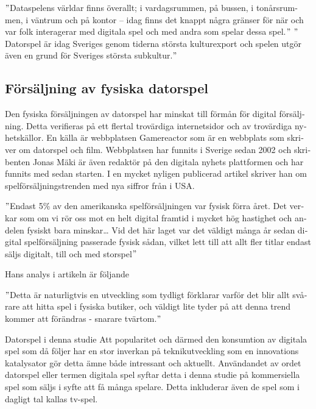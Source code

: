 \documentclass[11p]{article}
\begin{document}
\begin{otherlanguage}{swedish}
        \("\)Dataspelens världar finns överallt; i vardagsrummen, på bussen, i tonårsrummen, i väntrum och på kontor – idag finns det knappt några gränser för när och var folk interagerar med digitala spel och med andra som spelar dessa spel.\("\)
        \("\)Datorspel är idag Sveriges genom tiderna största kulturexport och spelen utgör även en grund för Sveriges största subkultur.\("\)\parencite{worlds}

        \setlength{\leftskip}{0cm}


        \subsection{Försäljning av fysiska datorspel}
        Den fysiska försäljningen av datorspel har minskat till förmån för digital försäljning.
        Detta verifieras på ett flertal trovärdiga internetsidor och av trovärdiga nyhetskällor.
        En källa är webbplatsen Gamereactor som är en webbplats som skriver om datorspel och film.
        Webbplatsen har funnits i Sverige sedan 2002 och skribenten Jonas Mäki är även redaktör på den digitala nyhets plattformen och har funnits med sedan starten.
        I en mycket nyligen publicerad artikel skriver han om spelförsäljningstrenden med nya siffror från i USA.

        \setlength{\leftskip}{1cm}

        \("\)Endast 5\% av den amerikanska spelförsäljningen var fysisk förra året.
        Det verkar som om vi rör oss mot en helt digital framtid i mycket hög hastighet och andelen fysiskt bara minskar\ldots
        Vid det här laget var det väldigt många år sedan digital spelförsäljning passerade fysisk sådan, vilket lett till att allt fler titlar endast säljs digitalt, till och med storspel\("\)

        \setlength{\leftskip}{0cm}

        Hans analys i artikeln är följande

        \setlength{\leftskip}{1cm}

        \("\)Detta är naturligtvis en utveckling som tydligt förklarar varför det blir allt svårare att hitta spel i fysiska butiker, och väldigt lite tyder på att denna trend kommer att förändras - snarare tvärtom.\("\)\parencite{amerikanska}

        \setlength{\leftskip}{0cm}

        Datorspel i denna studie
        Att popularitet och därmed den konsumtion av digitala spel som då följer har en stor inverkan på teknikutveckling som en innovations katalysator gör detta ämne både intressant och aktuellt.
        Användandet av ordet datorspel eller termen digitala spel syftar detta i denna studie på kommersiella spel som säljs i syfte att få många spelare.
        Detta inkluderar även de spel som i dagligt tal kallas tv-spel.


\end{otherlanguage}
\end{document}
